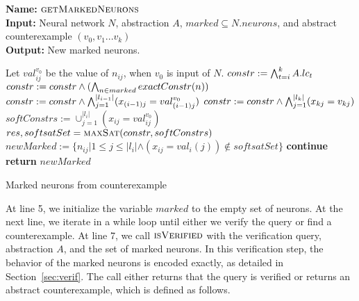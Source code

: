 \begin{algorithm}[t]
  \textbf{Name: } $\textsc{getMarkedNeurons}$ \\
  \textbf{Input: } Neural network $N$, \deeppoly{} abstraction $A$, $marked\subseteq N.neurons$, and abstract counterexample $({v_0}, {v_1} ... {v_k})$\\
  \textbf{Output: } New marked neurons. 
  \begin{algorithmic}[1]
    \State Let ${val^{v_0}_{ij}}$ be the value of $n_{ij}$, when ${v_0}$ is input of $N$. 
     
        \State $constr := \bigwedge_{t=i}^k A.lc_t$
        \State $constr := constr \land (\bigwedge_{n \in marked} exactConstr(n))$ 
        \State $constr := constr \land \bigwedge_{j=1}^{|l_{i-1}|} (x_{(i-1)j} = val^{v_0}_{(i-1)j})$
        \State $constr := constr \land \bigwedge_{j=1}^{|l_k|} (x_{kj} = v_{kj})$
        \State $softConstrs := \cup_{j=1}^{|l_i|} (x_{ij} = val^{v_0}_{ij})$
        \State $res, softsatSet = \textsc{maxSat}{}(constr, softConstrs)$ 
        \State $newMarked := \{n_{ij} | 1 \leq j \leq |l_i| \land (x_{ij} = val_i(j)) \notin  softsatSet\}$ 
          \State \textbf{continue}
        \Else
          \State \textbf{return} $newMarked$
        \EndIf 
      \EndIf
    \EndFor
  \end{algorithmic}
  \caption{Marked neurons from counterexample}
  \label{algo:refine2}
\end{algorithm}

At line 5, we initialize the variable $marked$ to the empty set of neurons.  At the next line, we iterate in a while loop until 
either we verify the query or find a counterexample. At line 7, we call $\textsc{isVerified}$ with the verification query, 
abstraction $A$, and the set of marked neurons. In this verification step, the behavior of the marked neurons is encoded exactly, 
as detailed in Section~\ref{sec:verif}. The call either returns that the query is verified or returns an abstract counterexample, 
which is defined as follows.


